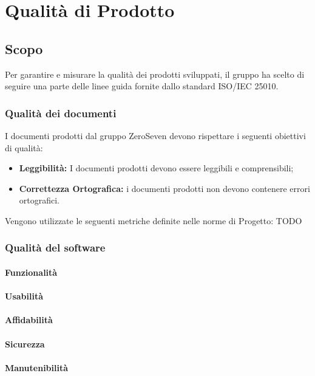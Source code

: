 \chapter{Qualità di Prodotto}
\section{Scopo}
Per garantire e misurare la qualità dei prodotti sviluppati, il gruppo ha scelto di seguire una parte delle linee guida fornite dallo standard ISO/IEC 25010.\\
\subsection{Qualità dei documenti}
I documenti prodotti dal gruppo ZeroSeven devono rispettare i seguenti obiettivi di qualità:
\begin{itemize}
    \item \textbf{Leggibilità:} I documenti prodotti devono essere leggibili e comprensibili;
    \item \textbf{Correttezza Ortografica:} i documenti prodotti non devono contenere errori ortografici.
\end{itemize}
Vengono utilizzate le seguenti metriche definite nelle norme di Progetto:
TODO

\subsection{Qualità del software}
\subsubsection{Funzionalità}
\subsubsection{Usabilità}
\subsubsection{Affidabilità}
\subsubsection{Sicurezza}
\subsubsection{Manutenibilità}